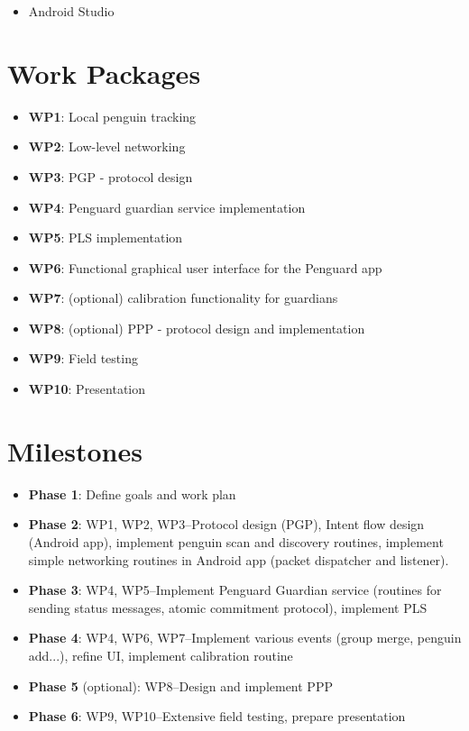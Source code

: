 \documentclass{report}
\begin{document}
\begin{itemize}
    \item Android Studio
\end{itemize}


\section{Work Packages}

\begin{itemize}
        \item {\bf WP1}: Local penguin tracking
        \item {\bf WP2}: Low-level networking
        \item {\bf WP3}: PGP - protocol design
        \item {\bf WP4}: Penguard guardian service implementation
        \item {\bf WP5}: PLS implementation
        \item {\bf WP6}: Functional graphical user interface for the Penguard app
        \item {\bf WP7}: (optional) calibration functionality for guardians
        \item {\bf WP8}: (optional) PPP - protocol design and implementation
        \item {\bf WP9}: Field testing
        \item {\bf WP10}: Presentation
\end{itemize}
 

\section{Milestones}

\begin{itemize}
    \item \textbf{Phase 1}: Define goals and work plan
    \item \textbf{Phase 2}: WP1, WP2, WP3--Protocol design (PGP), Intent flow design (Android app), implement penguin scan and discovery routines, implement simple networking routines in Android app (packet dispatcher and listener).
    \item \textbf{Phase 3}: WP4, WP5--Implement Penguard Guardian service (routines for sending status messages, atomic commitment protocol), implement PLS
    \item \textbf{Phase 4}: WP4, WP6, WP7--Implement various events (group merge, penguin add...), refine UI, implement calibration routine
    \item \textbf{Phase 5} (optional): WP8--Design and implement PPP
    \item \textbf{Phase 6}: WP9, WP10--Extensive field testing, prepare presentation
\end{itemize}
\end{document}
